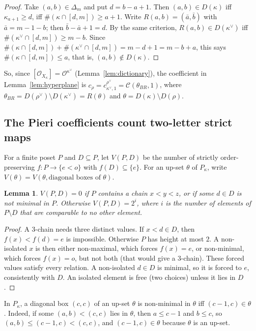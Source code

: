 \documentclass[11pt]{amsart}
\newtheorem{lemma}[theorem]{Lemma}
\theoremstyle{definition}
\theoremstyle{remark}
\newcommand{\cO}{\mathcal{O}}
\newcommand{\cC}{\mathcal{C}}
\begin{document}
\begin{proof}
Take $(a,b)\in\Delta_m$ and put $d=b-a+1$. Then $(a,b)\in D(\kappa)$ iff $\kappa_{a+1}\ge d$,
iff $\#(\kappa\cap[d,m])\ge a+1$. Write $R(a,b)=(\bar a,\bar b)$ with $\bar a=m-1-b$; then
$\bar b-\bar a+1=d$. By the same criterion, $R(a,b)\in D(\kappa^\vee)$ iff
$\#(\kappa^\vee\cap[d,m])\ge m-b$. Since
$\#(\kappa\cap[d,m])+\#(\kappa^\vee\cap[d,m])=m-d+1=m-b+a$, this says
$\#(\kappa\cap[d,m])\le a$, that is, $(a,b)\notin D(\kappa)$.
\end{proof}

So, since $[\cO_{X_\kappa}]=\cO^{\kappa^\vee}$ (Lemma~\ref{lem:dictionary}), the
coefficient in Lemma~\ref{lem:hyperplane} is
$c_\rho=c^{\rho^\vee}_{\kappa^\vee,1}=\cC(\theta_{BR},1)$, where
$\theta_{BR}=D(\rho^\vee)\setminus D(\kappa^\vee)=R(\theta)$ and
$\theta=D(\kappa)\setminus D(\rho)$.

\subsection{The Pieri coefficients count two-letter strict maps}

For a finite poset $P$ and $D\subseteq P$, let $V(P,D)$ be the number of strictly
order-preserving $f\colon P\to\{e<o\}$ with $f(D)\subseteq\{e\}$. For an up-set $\theta$ of
$P_\kappa$, write $V(\theta)=V(\theta,\text{diagonal boxes of }\theta)$.

\begin{lemma}\label{lem:R}
$V(P,D)=0$ if $P$ contains a chain $x<y<z$, or if some $d\in D$ is not minimal in $P$.
Otherwise $V(P,D)=2^i$, where $i$ is the number of elements of $P\setminus D$ that are
comparable to no other element.
\end{lemma}

\begin{proof}
A $3$-chain needs three distinct values. If $x<d\in D$, then $f(x)<f(d)=e$ is impossible.
Otherwise $P$ has height at most $2$. A non-isolated $x$ is then either non-maximal, which
forces $f(x)=e$, or non-minimal, which forces $f(x)=o$, but not both (that would give a
$3$-chain). These forced values satisfy every relation. A non-isolated $d\in D$ is minimal, so
it is forced to $e$, consistently with $D$. An isolated element is free (two choices) unless it
lies in $D$.
\end{proof}

In $P_\kappa$, a diagonal box $(c,c)$ of an up-set $\theta$ is non-minimal in $\theta$ iff
$(c-1,c)\in\theta$. Indeed, if some $(a,b)<(c,c)$ lies in $\theta$, then $a\le c-1$ and
$b\le c$, so $(a,b)\le(c-1,c)<(c,c)$, and $(c-1,c)\in\theta$ because $\theta$ is an up-set.
\end{document}
